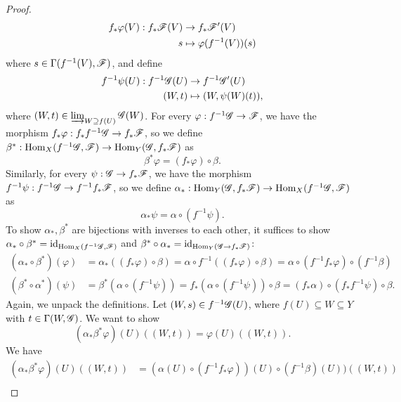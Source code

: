 \documentclass{article}
\begin{document}
\begin{enumerate} [label=\textbf{\arabic*.}, leftmargin=0em]
\begin{proof}
    \begin{align*}
       f_* \varphi(V) : f_* \mathscr{F}(V) & \to  f_* \mathscr{F}'(V)  \\
        s & \mapsto \varphi(f^{-1}(V))(s)
    \end{align*}
    where $s \in \Gamma(f^{-1}(V), \mathscr{F})$, and define
    \begin{align*}
        f^{-1} \psi(U) : f^{-1} \mathscr{G}(U) & \to f^{-1} \mathscr{G}'(U) \\
        (W, t) & \mapsto (W, \psi(W)(t)),
    \end{align*}
    where $(W, t) \in \varinjlim_{W \supseteq f(U)} \mathscr{G}(W)$. For every $\varphi : f^{-1} \mathscr{G} \to \mathscr{F}$, we have the morphism $f_* \varphi : f_* f^{-1} \mathscr{G} \to f_* \mathscr{F}$, so we define $\beta^* : \operatorname{Hom}_X(f^{-1} \mathscr{G}, \mathscr{F}) \to \operatorname{Hom}_Y(\mathscr{G}, f_* \mathscr{F})$ as
    \begin{equation*}
        \beta^* \varphi = (f_* \varphi) \circ \beta.
    \end{equation*}
    Similarly, for every $\psi : \mathscr{G} \to f_* \mathscr{F}$, we have the morphism $f^{-1} \psi : f^{-1} \mathscr{G} \to f^{-1} f_* \mathscr{F}$, so we define $\alpha_* : \operatorname{Hom}_Y(\mathscr{G}, f_* \mathscr{F}) \to \operatorname{Hom}_X(f^{-1} \mathscr{G}, \mathscr{F})$ as
    \begin{equation*}
        \alpha_* \psi = \alpha \circ (f^{-1} \psi).
    \end{equation*}
    To show $\alpha_*, \beta^*$ are bijections with inverses to each other, it suffices to show $\alpha_* \circ \beta^* = \text{id}_{\operatorname{Hom}_X(f^{-1} \mathscr{G}, \mathscr{F})}$ and $\beta^* \circ \alpha_* = \text{id}_{\operatorname{Hom}_Y(\mathscr{G} \to f_* \mathscr{F})}$:
    \begin{align*}
        (\alpha_* \circ \beta^*)(\varphi) & = \alpha_*((f_* \varphi) \circ \beta) = \alpha \circ f^{-1}((f_* \varphi) \circ \beta) = \alpha \circ (f^{-1} f_* \varphi) \circ (f^{-1} \beta) \\
        (\beta^* \circ \alpha^*)(\psi) & = \beta^*(\alpha \circ (f^{-1} \psi)) = f_*(\alpha \circ (f^{-1}\psi)) \circ \beta = (f_* \alpha) \circ (f_*f^{-1} \psi) \circ \beta.
    \end{align*}
    Again, we unpack the definitions. Let $(W, s) \in f^{-1} \mathscr{G}(U)$, where $f(U) \subseteq W \subseteq Y$ with $t \in \Gamma(W, \mathscr{G})$. We want to show
    \begin{equation*}
        (\alpha_*\beta^*\varphi)(U)((W, t)) = \varphi(U)((W, t)).
    \end{equation*}
    We have
    \begin{align*}
        (\alpha_*\beta^*\varphi)(U)((W, t)) & = (\alpha(U) \circ (f^{-1}f_* \varphi))(U) \circ (f^{-1} \beta)(U))((W, t)) \\

\end{align*}
\end{proof}
\end{enumerate}
\end{document}
